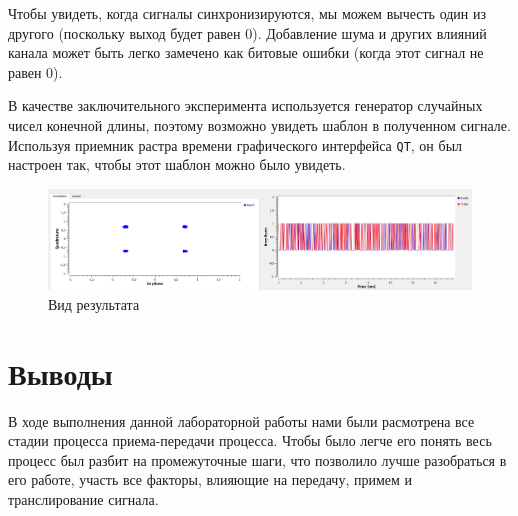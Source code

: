 \documentclass[a4paper]{article}
\begin{document}
            Чтобы увидеть, когда сигналы синхронизируются, мы можем вычесть один из другого (поскольку выход будет равен 0). Добавление шума и других влияний канала может быть легко замечено как битовые ошибки (когда этот сигнал не равен 0). 
            
            В качестве заключительного эксперимента используется генератор случайных чисел конечной длины, поэтому возможно увидеть шаблон в полученном сигнале. Используя приемник растра времени графического интерфейса \texttt{QT}, он был настроен так, чтобы этот шаблон можно было увидеть.
            
            \begin{figure}[H]
                \centering
                \includegraphics[width=\textwidth]{ex_8_2.png}
                \caption{Вид результата}
                \label{fig:ex_8_2}
            \end{figure}
            
    \newpage
        \section{Выводы}
            В ходе выполнения данной лабораторной работы нами были расмотрена все стадии процесса приема-передачи процесса. Чтобы было легче его понять весь процесс был разбит на промежуточные шаги, что позволило лучше разобраться в его работе, участь все факторы, влияющие на передачу, примем и транслирование сигнала.
            
\end{document}
